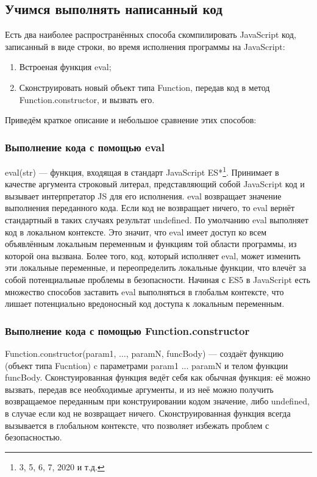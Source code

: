 \documentclass[12pt]{article}
\begin{document}
    \subsection{Учимся выполнять написанный код}
    Есть два наиболее распространённых способа скомпилировать JavaScript код, записанный в виде строки, во время исполнения программы на JavaScript:
    \begin{enumerate}
        \item Встроеная функция eval;
        \item Сконструировать новый объект типа Function, передав код в метод Function.constructor, и вызвать его.
    \end{enumerate}
    Приведём краткое описание и небольшое сравнение этих способов:

    \subsubsection{Выполнение кода с помощью eval}
    eval(str)\cite{JSeval} --- функция, входящая в стандарт JavaScript ES*\footnote{3, 5, 6, 7, 2020 и т.д.}. Принимает в качестве аргумента строковый литерал, представляющий собой
    JavaScript код и вызывает интерпретатор JS для его исполнения. eval возвращает значение выполнения переданного кода. Если код не возвращает
    ничего, то eval вернёт стандартный в таких случаях результат undefined. По умолчанию eval выполняет код в локальном контексте.
    Это значит, что eval имеет доступ ко всем объявлённым локальным переменным и функциям той области программы, из которой она вызвана.
    Более того, код, который исполняет eval, может изменить эти локальные переменные, и переопределить локальные функции, что влечёт за собой
    потенциальные проблемы в безопасности. Начиная с ES5 в JavaScript есть множество способов заставить eval выполняться в глобальм контексте,
    что лишает потенциально вредоносный код доступа к локальным переменным.

    \subsubsection{Выполнение кода с помощью Function.constructor}
    Function.constructor(param1, $\ldots$, paramN, funcBody) \cite{FuctionConstructor} --- создаёт функцию (объект типа Fucntion) c параметрами param1 ... paramN и
    телом функции funcBody. Сконстуированная функция ведёт себя как обычная функция: её можно вызвать, передав все необходимые аргументы,
    и из неё можно получить возвращаемое переданным при конструировании кодом значение, либо undefined, в случае если код не возвращает ничего.
    Сконструированная функция всегда вызывается в глобальном контексте, что позволяет избежать проблем с безопасностью.
\end{document}

